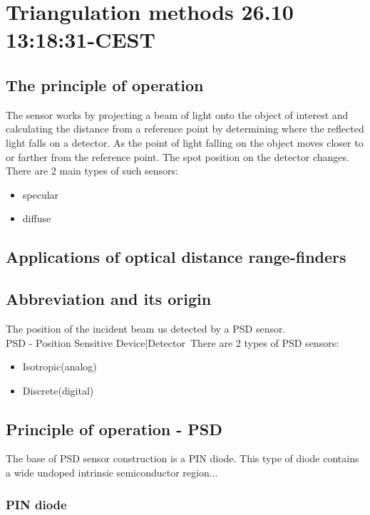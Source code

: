 \chapter{Triangulation methods 26.10	13:18:31-CEST}
\section{The principle of operation}
The sensor works by projecting a beam of light onto the object of interest and calculating the distance from a reference point by determining
where the reflected light falls on a detector. As the point of light falling on the object moves closer to or farther from the reference point. The spot position on the detector changes.\\
There are 2 main types of such sensors:
\begin{itemize}
        \item specular
        \item diffuse
        
\end{itemize}
\section{Applications of optical distance range-finders}
\section{Abbreviation and its origin}
The position of the incident beam us detected by a PSD sensor.\\
PSD - Position Sensitive Device|Detector\
There are 2 types of PSD sensors:
\begin{itemize}
    \item Isotropic(analog)
    \item Discrete(digital)
\end{itemize}
\section{Principle of operation - PSD}
The base of PSD sensor construction is a PIN diode. This type of diode contains a wide undoped intrinsic semiconductor region...

\subsection{PIN diode}

